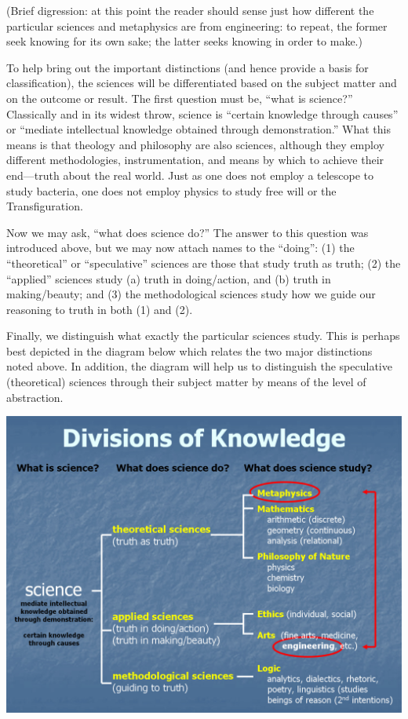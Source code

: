 (Brief digression: at this point the reader should sense just how different the particular sciences and metaphysics are from engineering: to repeat, the former seek knowing for its own sake; the latter seeks knowing in order to make.)

To help bring out the important distinctions (and hence provide a basis for classification), the sciences will be differentiated based on the subject matter and on the outcome or result. The first question must be, ``what is science?'' Classically and in its widest throw, science is ``certain knowledge through causes'' or ``mediate intellectual knowledge obtained through demonstration.'' What this means is that theology and philosophy are also sciences, although they employ different methodologies, instrumentation, and means by which to achieve their end---truth about the real world. Just as one does not employ a telescope to study bacteria, one does not employ physics to study free will or the Transfiguration.

Now we may ask, ``what does science do?'' The answer to this question was introduced above, but we may now attach names to the ``doing'': (1) the ``theoretical'' or ``speculative'' sciences are those that study truth as truth; (2) the ``applied'' sciences study (a) truth in doing/action, and (b) truth in making/beauty; and (3) the methodological sciences study how we guide our reasoning to truth in both (1) and (2).

Finally, we distinguish what exactly the particular sciences study. This is perhaps best depicted in the diagram below which relates the two major distinctions noted above. In addition, the diagram will help us to distinguish the speculative (theoretical) sciences through their subject matter by means of the level of abstraction.

\begin{center}
\includegraphics[scale=0.6]{sich_science_taxonomy.jpg}
\end{center}

